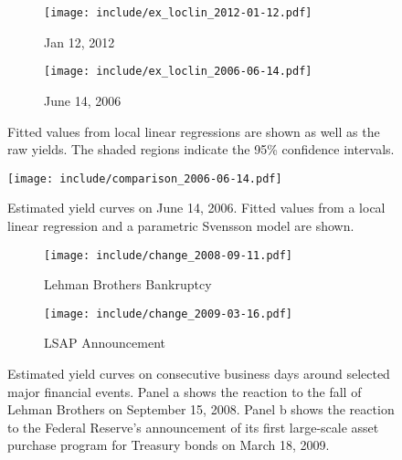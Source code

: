 \documentclass[12pt]{article}
\begin{document}
\begin{figure}[htb] \centering
    \begin{subfigure}[t]{.49\linewidth}
        \texttt{[image: include/ex\_loclin\_2012-01-12.pdf]}
        \caption{Jan 12, 2012} \label{fig:ex_loclin_1-12-2012}
    \end{subfigure}
    \begin{subfigure}[t]{.49\linewidth}
        \texttt{[image: include/ex\_loclin\_2006-06-14.pdf]}
        \caption{June 14, 2006} \label{fig:ex_loclin_6-14-2006}
    \end{subfigure}
    \caption{Fitted values from local linear regressions are shown as well as the raw yields. The shaded regions indicate the 95\% confidence intervals.}
    \label{fig:ex_loclin}
\end{figure}



\begin{figure}[htb]
    \centering
    \texttt{[image: include/comparison\_2006-06-14.pdf]}
    \caption{Estimated yield curves on June 14, 2006. Fitted values from a local linear regression and a parametric Svensson model are shown.}
    \label{fig:comparison_bad}
\end{figure}



\begin{figure}[htb] \centering
    \begin{subfigure}[t]{.49\linewidth}
        \texttt{[image: include/change\_2008-09-11.pdf]}
        \caption{Lehman Brothers Bankruptcy} \label{fig:events_lehman}
    \end{subfigure}
    \begin{subfigure}[t]{.49\linewidth}
        \texttt{[image: include/change\_2009-03-16.pdf]}
        \caption{LSAP Announcement} \label{fig:events_lsap}
    \end{subfigure}
    \caption{Estimated yield curves on consecutive business days around selected major financial events. Panel a shows the reaction to the fall of Lehman Brothers on September 15, 2008. Panel b shows the reaction to the Federal Reserve's announcement of its first large-scale asset purchase program for Treasury bonds on March 18, 2009. }
    \label{fig:events}
\end{figure}



\vfill
\FloatBarrier


\end{document}

